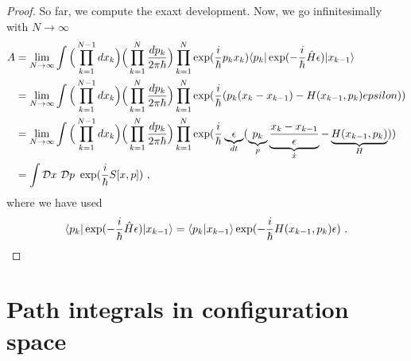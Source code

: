 \begin{proof}
        So far, we compute the exaxt development. Now, we go infinitesimally with $N \rightarrow \infty$
        \begin{equation*}
        \begin{aligned}
            A & = \lim_{N \rightarrow \infty} \int \Big ( \prod_{k=1}^{N-1} dx_k \Big) \Big ( \prod_{k=1}^{N} \frac{dp_k}{2 \pi \hbar} \Big) \prod_{k=1}^{N} \exp(\frac{i}{\hbar} p_k x_k) \langle p_k\vert \exp(- \frac{i}{\hbar} \hat H \epsilon) \vert x_{k-1}\rangle \\ & = \lim_{N \rightarrow \infty} \int \Big ( \prod_{k=1}^{N-1} dx_k \Big) \Big ( \prod_{k=1}^{N} \frac{dp_k}{2 \pi \hbar} \Big) \prod_{k=1}^{N} \exp(\frac{i}{\hbar} (p_k (x_k - x_{k-1}) - H(x_{k-1}, p_k) epsilon )) \\ & = \lim_{N \rightarrow \infty} \int \Big ( \prod_{k=1}^{N-1} dx_k \Big) \Big ( \prod_{k=1}^{N} \frac{dp_k}{2 \pi \hbar} \Big) \prod_{k=1}^{N} \exp(\frac{i}{\hbar} \underbrace{\epsilon}_{dt} (\underbrace{p_k}_p \underbrace{\frac{x_k-x_{k-1}}{\epsilon}}_{\dot x} - \underbrace{H(x_{k-1}, p_k)}_{H} )) \\ & = \int \mathcal D x ~ \mathcal D p ~ \exp(\frac{i}{\hbar} S[x,p]) ~,
        \end{aligned}
        \end{equation*}
        where we have used
        \begin{equation*}
            \langle p_k\vert \exp(- \frac{i}{\hbar} \hat H \epsilon) \vert x_{k-1}\rangle = \langle p_k\vert x_{k-1}\rangle \exp(- \frac{i}{\hbar} H (x_{k-1}, p_k) \epsilon) ~.
        \end{equation*}
    \end{proof}

\chapter{Path integrals in configuration space}

